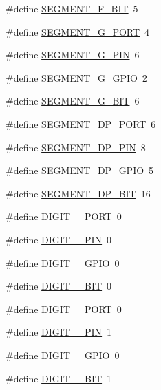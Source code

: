 \begin{DoxyCompactItemize}
\item 
\#define \hyperlink{group__hal_ga72af432101a174e6dbadba56d617c8c0}{S\+E\+G\+M\+E\+N\+T\+\_\+\+F\+\_\+\+B\+IT}~5
\item 
\#define \hyperlink{group__hal_ga089beff59c1a1594c602a3f1668a5cae}{S\+E\+G\+M\+E\+N\+T\+\_\+\+G\+\_\+\+P\+O\+RT}~4
\item 
\#define \hyperlink{group__hal_ga3281b5b95b4c76fc422873c7b9d0c39a}{S\+E\+G\+M\+E\+N\+T\+\_\+\+G\+\_\+\+P\+IN}~6
\item 
\#define \hyperlink{group__hal_gaea3bf9c5df901e959eeb0e906c5dfac6}{S\+E\+G\+M\+E\+N\+T\+\_\+\+G\+\_\+\+G\+P\+IO}~2
\item 
\#define \hyperlink{group__hal_ga75f6e2dae6677f4ddad5120a1b66f2d7}{S\+E\+G\+M\+E\+N\+T\+\_\+\+G\+\_\+\+B\+IT}~6
\item 
\#define \hyperlink{group__hal_gaaee9c92a11acc12e3774fee38fb36238}{S\+E\+G\+M\+E\+N\+T\+\_\+\+D\+P\+\_\+\+P\+O\+RT}~6
\item 
\#define \hyperlink{group__hal_gad543e608ea7a2ca92dc3420ce3240333}{S\+E\+G\+M\+E\+N\+T\+\_\+\+D\+P\+\_\+\+P\+IN}~8
\item 
\#define \hyperlink{group__hal_gace15163ca1e16645042e31aaf4f2cafb}{S\+E\+G\+M\+E\+N\+T\+\_\+\+D\+P\+\_\+\+G\+P\+IO}~5
\item 
\#define \hyperlink{group__hal_gaff4184966fc4e46492d5c3fc98a38b06}{S\+E\+G\+M\+E\+N\+T\+\_\+\+D\+P\+\_\+\+B\+IT}~16
\item 
\#define \hyperlink{group__hal_ga78f52a22c98f23423dcda6b28779114b}{D\+I\+G\+I\+T\+\_\+\_\+\+P\+O\+RT}~0
\item 
\#define \hyperlink{group__hal_ga9200506b5f69d0208deeb2061bbfe308}{D\+I\+G\+I\+T\+\_\+\_\+\+P\+IN}~0
\item 
\#define \hyperlink{group__hal_gae5605c3ac9f4ce97d2bc363826d8fc7f}{D\+I\+G\+I\+T\+\_\+\_\+\+G\+P\+IO}~0
\item 
\#define \hyperlink{group__hal_ga1a1fa96ee3948f90d84ecfaf2c4f76a4}{D\+I\+G\+I\+T\+\_\+\_\+\+B\+IT}~0
\item 
\#define \hyperlink{group__hal_gaa92df493e248da0cfeaf755bd7239f21}{D\+I\+G\+I\+T\+\_\+\_\+\+P\+O\+RT}~0
\item 
\#define \hyperlink{group__hal_ga018d49ac62ace8d1df56f43a936bb236}{D\+I\+G\+I\+T\+\_\+\_\+\+P\+IN}~1
\item 
\#define \hyperlink{group__hal_gacfbaeac627d0ed6499c0e3622e81f065}{D\+I\+G\+I\+T\+\_\+\_\+\+G\+P\+IO}~0
\item 
\#define \hyperlink{group__hal_ga7bfe5eb0b3af9a09b591c9da8006a4c5}{D\+I\+G\+I\+T\+\_\+\_\+\+B\+IT}~1

\end{DoxyCompactItemize}
